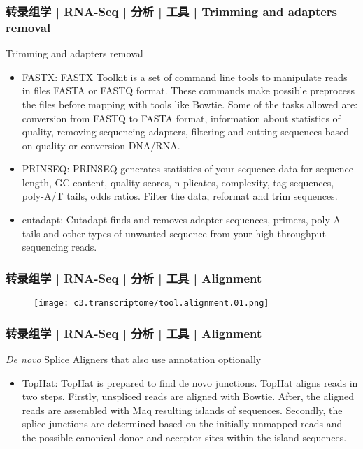 \begin{frame}
  \frametitle{转录组学 | RNA-Seq | 分析 | 工具 | Trimming and adapters removal}
    {\footnotesize
  \begin{block}{Trimming and adapters removal}
    \begin{itemize}
      \item FASTX: FASTX Toolkit is a set of command line tools to manipulate reads in files FASTA or FASTQ format. These commands make possible preprocess the files before mapping with tools like Bowtie. Some of the tasks allowed are: conversion from FASTQ to FASTA format, information about statistics of quality, removing sequencing adapters, filtering and cutting sequences based on quality or conversion DNA/RNA.
      \item PRINSEQ: PRINSEQ generates statistics of your sequence data for sequence length, GC content, quality scores, n-plicates, complexity, tag sequences, poly-A/T tails, odds ratios. Filter the data, reformat and trim sequences.
      \item cutadapt: Cutadapt finds and removes adapter sequences, primers, poly-A tails and other types of unwanted sequence from your high-throughput sequencing reads.
    \end{itemize}
  \end{block}
  }
\end{frame}

\begin{frame}
  \frametitle{转录组学 | RNA-Seq | 分析 | 工具 | Alignment}
  \begin{figure}
    \centering
    \texttt{[image: c3.transcriptome/tool.alignment.01.png]}
  \end{figure}
\end{frame}

\begin{frame}
  \frametitle{转录组学 | RNA-Seq | 分析 | 工具 | Alignment}
  \begin{block}{\textit{De novo} Splice Aligners that also use annotation optionally}
    \begin{itemize}
      \item TopHat: TopHat is prepared to find de novo junctions. TopHat aligns reads in two steps. Firstly, unspliced reads are aligned with Bowtie. After, the aligned reads are assembled with Maq resulting islands of sequences. Secondly, the splice junctions are determined based on the initially unmapped reads and the possible canonical donor and acceptor sites within the island sequences.
    \end{itemize}
  \end{block}
\end{frame}

